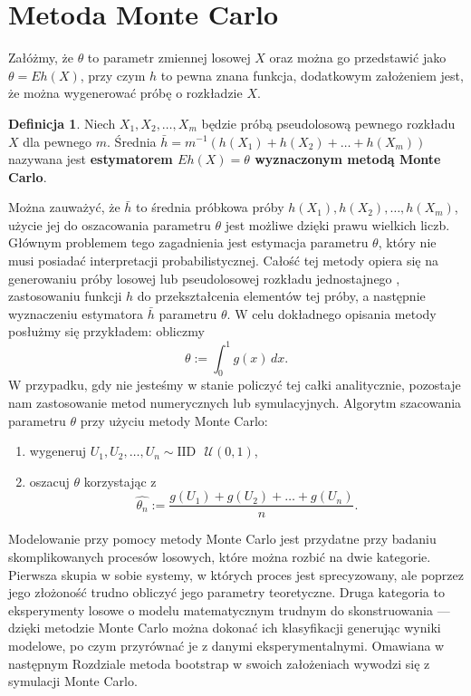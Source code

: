\documentclass[inzynierska]{pwr_wmat_praca_dyplomowa}
\theoremstyle{plain}
\numberwithin{theorem}{chapter}
\theoremstyle{definition}
\numberwithin{theorem}{chapter}
\newtheorem{definition}[theorem]{Definicja}
\begin{document}
\section{Metoda Monte Carlo}
Załóżmy, że $\theta$ to parametr zmiennej losowej $X$ oraz można go przedstawić jako $\theta=Eh(X)$, przy czym $h$ to pewna znana funkcja, dodatkowym założeniem jest, że można wygenerować próbę o rozkładzie $X$. 
\begin{definition}
	Niech $X_1,X_2,\dots,X_m$ będzie próbą pseudolosową pewnego rozkładu $X$ dla pewnego $m$. Średnia $\bar{h}=m^{-1}(h(X_1)+h(X_2)+\dots +h(X_m))$ nazywana jest \textbf{estymatorem $Eh(X)=\theta$ wyznaczonym metodą Monte Carlo}.
\end{definition}
Można zauważyć, że $\bar{h}$ to średnia próbkowa próby $h(X_1),h(X_2),\dots ,h(X_m)$, użycie jej do oszacowania parametru $\theta$ jest możliwe dzięki prawu wielkich liczb. Głównym problemem tego zagadnienia jest estymacja parametru $\theta$, który nie musi posiadać interpretacji probabilistycznej. Całość tej metody opiera się na generowaniu próby losowej lub pseudolosowej rozkładu jednostajnego , zastosowaniu funkcji $h$ do przekształcenia elementów tej próby, a następnie wyznaczeniu estymatora $\bar{h}$ parametru $\theta$. 
W celu dokładnego opisania metody posłużmy się przykładem: obliczmy
\begin{equation}
	\theta:=\int_{0}^{1}g(x)\,dx.
\end{equation}
W przypadku, gdy nie jesteśmy w stanie policzyć tej całki analitycznie, pozostaje nam zastosowanie metod numerycznych lub symulacyjnych. Algorytm szacowania parametru $\theta$ przy użyciu metody Monte Carlo:
\begin{enumerate}
	\item wygeneruj $U_1,U_2,\dots, U_n \sim \text{IID}\,\,\,\, \mathcal{U}(0,1)$,
	\item oszacuj $\theta$ korzystając z
	\begin{equation}
		\hat{\theta_n}:= \frac{g(U_1)+g(U_2)+\dots+g(U_n)}{n}.
	\end{equation}
\end{enumerate} 

Modelowanie przy pomocy metody Monte Carlo jest przydatne przy badaniu skomplikowanych procesów losowych, które można rozbić na dwie kategorie. Pierwsza skupia w sobie systemy, w których proces jest sprecyzowany, ale poprzez jego złożoność trudno obliczyć jego parametry teoretyczne. Druga kategoria to eksperymenty losowe o modelu matematycznym trudnym do skonstruowania --- dzięki metodzie Monte Carlo można dokonać ich klasyfikacji generując wyniki modelowe, po czym przyrównać je z danymi eksperymentalnymi. Omawiana w następnym Rozdziale metoda bootstrap w swoich założeniach wywodzi się z symulacji Monte Carlo.
\end{document}
